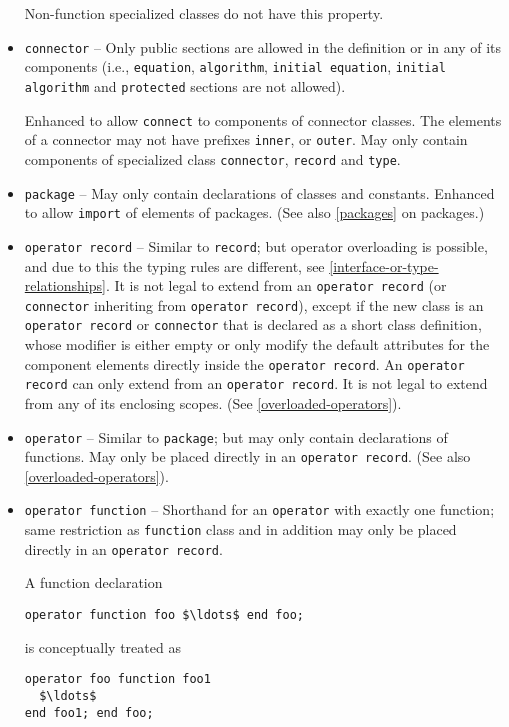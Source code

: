 \begin{itemize}
\begin{nonnormative}
Non-function specialized classes do not have this property.
\end{nonnormative}

\item \lstinline!connector! --
Only public sections are allowed in the definition or in any of its components (i.e., \lstinline!equation!, \lstinline!algorithm!, \lstinline!initial equation!, \lstinline!initial algorithm! and \lstinline!protected! sections are not allowed).

Enhanced to allow \lstinline!connect! to components of connector classes.  The elements of a connector may not have prefixes \lstinline!inner!, or \lstinline!outer!.  May only contain components of specialized class \lstinline!connector!, \lstinline!record! and \lstinline!type!.

\item \lstinline!package! --
May only contain declarations of classes and constants.  Enhanced to allow \lstinline!import! of elements of packages.  (See also \cref{packages} on packages.)

\item \lstinline!operator record! --
Similar to \lstinline!record!; but operator overloading is possible, and due to this the typing rules are different, see \cref{interface-or-type-relationships}.  It is not legal to extend from an \lstinline!operator record! (or \lstinline!connector! inheriting from \lstinline!operator record!), except if the new class is an \lstinline!operator record! or \lstinline!connector! that is declared as a short class definition, whose modifier is either empty or only modify the default attributes for the component elements directly inside the \lstinline!operator record!.  An \lstinline!operator record! can only extend from an \lstinline!operator record!.  It is not legal to extend from any of its enclosing scopes.  (See \cref{overloaded-operators}).

\item \lstinline!operator! --
Similar to \lstinline!package!; but may only contain declarations of functions.  May only be placed directly in an \lstinline!operator record!.  (See also \cref{overloaded-operators}).

\item \lstinline!operator function! --
Shorthand for an \lstinline!operator! with exactly one function; same restriction as \lstinline!function! class and in addition may only be placed directly in an \lstinline!operator record!.
\begin{nonnormative}
A function declaration
\begin{lstlisting}[language=modelica]
operator function foo $\ldots$ end foo;
\end{lstlisting}
is conceptually treated as
\begin{lstlisting}[language=modelica]
operator foo function foo1
  $\ldots$
end foo1; end foo;
\end{lstlisting}
\end{nonnormative}

\end{itemize}

